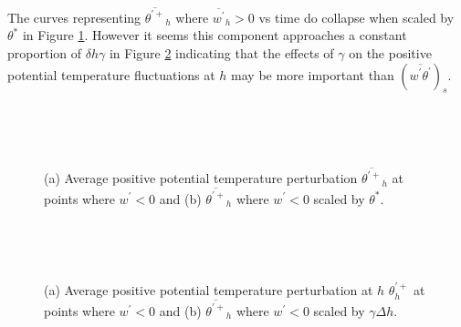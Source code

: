\clearpage


The curves representing $\overline{\theta^{'+}}_{h}$ where $\overline{w^{'}}_{h}>0$ vs time do collapse when scaled by $\theta^{*}$ in Figure \ref{fig:downwarm_theta}.  However it seems this component approaches a constant proportion of $\delta h \gamma$ in Figure \ref{fig:downwarm_theta1} indicating that the effects of $\gamma$ on the positive potential temperature fluctuations at $h$ may be more important than $(\overline{w^{'}\theta^{'}})_{s}$.\\ 

\begin{figure}[htbp]
\begin{minipage}[b]{0.5\linewidth}
        \\
        \end{minipage}             
\quad
\begin{minipage}[b]{0.5\linewidth}
        \\      
       \end{minipage}
        \caption[Positive potential temperature perturbation at $h$ (i)]{(a) Average positive potential temperature perturbation $\overline{\theta^{\prime+}}_{h}$ at points where $w^{\prime}<0$ and (b) $\overline{\theta^{\prime+}}_{h}$ where $w^{\prime}<0$ scaled by $\theta^{*}$.}
        \label{fig:downwarm_theta}
\end{figure}


\begin{figure}[htbp]
\begin{minipage}[b]{0.5\linewidth}
        \\
        \end{minipage}             
\quad
\begin{minipage}[b]{0.5\linewidth}
        \\      
       \end{minipage}
        \caption[Positive potential temperature perturbation at $h$ (ii)]{(a) Average positive potential temperature perturbation at $h$ $\theta^{\prime+}_{h}$ at points where $w^{\prime}<0$ and (b) $\overline{\theta^{\prime+}}_{h}$ where $w^{\prime}<0$ scaled by $\gamma \Delta h$.}
        \label{fig:downwarm_theta1}
\end{figure}

